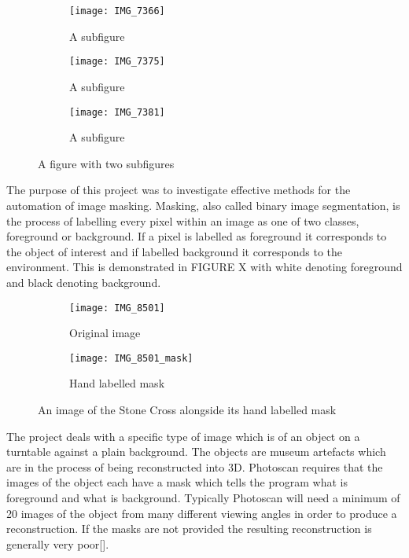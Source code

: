 \documentclass[12pt]{IIBproject}
\begin{document}
\begin{figure}[H]
\centering
\begin{subfigure}{.33\textwidth}
  \centering
  \texttt{[image: IMG\_7366]}
  \caption{A subfigure}
  \label{fig:sub1}
\end{subfigure}%
\begin{subfigure}{.33\textwidth}
  \centering
  \texttt{[image: IMG\_7375]}
  \caption{A subfigure}
  \label{fig:sub2}
\end{subfigure}
\begin{subfigure}{.33\textwidth}
  \centering
  \texttt{[image: IMG\_7381]}
  \caption{A subfigure}
  \label{fig:sub2}
\end{subfigure}
\caption{A figure with two subfigures}
\label{fig:test}
\end{figure}
The purpose of this project was to investigate effective methods for the automation of image masking. Masking, also called binary image segmentation, is the process of labelling every pixel within an image as one of two classes, foreground or background. If a pixel is labelled as foreground it corresponds to the object of interest and if labelled background it corresponds to the environment. This is demonstrated in FIGURE X with white denoting foreground and black denoting background. 
\begin{figure}[H]
\centering
\begin{subfigure}{.5\textwidth}
  \centering
  \texttt{[image: IMG\_8501]}
  \caption{Original image}
  \label{fig:sub1}
\end{subfigure}%
\begin{subfigure}{.5\textwidth}
  \centering
  \texttt{[image: IMG\_8501\_mask]}
  \caption{Hand labelled mask}
  \label{fig:sub2}
\end{subfigure}
\caption{An image of the Stone Cross alongside its hand labelled mask}
\label{fig:test}
\end{figure}
The project deals with a specific type of image which is of an object on a turntable against a plain background. The objects are museum artefacts which are in the process of being reconstructed into 3D. Photoscan requires that the images of the object each have a mask which tells the program what is foreground and what is background. Typically Photoscan will need a minimum of 20 images of the object from many different viewing angles in order to produce a reconstruction. If the masks are not provided the resulting reconstruction is generally very poor[]. 
\end{document}
